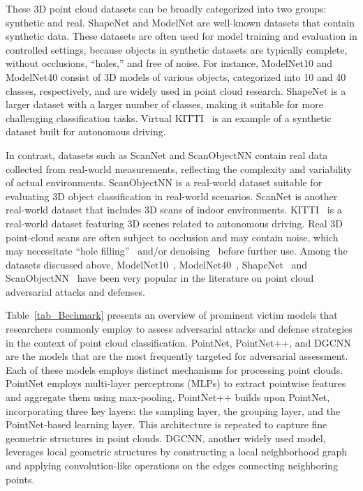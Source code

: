 \documentclass{ieeeaccess}
\begin{document}
These 3D point cloud datasets can be broadly categorized into two groups: synthetic and real. ShapeNet and ModelNet are well-known datasets that contain synthetic data. These datasets are often used for model training and evaluation in controlled settings, because objects in synthetic datasets are typically complete, without occlusions, ``holes,'' and free of noise. For instance, ModelNet10 and ModelNet40 consist of 3D models of various objects, categorized into 10 and 40 classes, respectively, and are widely used in point cloud research. ShapeNet is a larger dataset with a larger number of classes, making it suitable for more challenging classification tasks. Virtual KITTI~\cite{gaidon2016virtual} is an example of a synthetic dataset built for autonomous driving.  

In contrast, datasets such as ScanNet and ScanObjectNN contain real data collected from real-world measurements, reflecting the complexity and variability of actual environments. ScanObjectNN is a real-world dataset suitable for evaluating 3D object classification in real-world scenarios. ScanNet is another real-world dataset that includes 3D scans of indoor environments.  KITTI~\cite{geiger2012we} is a real-world dataset featuring 3D scenes related to autonomous driving. Real 3D point-cloud scans are often subject to occlusion and may contain noise, which may necessitate ``hole filling''~\cite{dinesh2018inpainting} and/or denoising~\cite{dinesh2020point} before further use.
Among the datasets discussed above,  ModelNet10~\cite{wu20153d}, ModelNet40~\cite{wu20153d}, ShapeNet~\cite{chang2015shapenet} and ScanObjectNN~\cite{uy2019revisiting} have been very popular in the literature on point cloud adversarial attacks and defenses. 

Table~\ref{tab_Bechmark} presents an overview of prominent victim models that researchers commonly employ to assess adversarial attacks and defense strategies in the context of point cloud classification. PointNet, PointNet++, and DGCNN are the models that are the most frequently targeted for adversarial assessment.
Each of these models employs distinct mechanisms for processing point clouds. PointNet employs multi-layer perceptrons (MLPs) to extract pointwise features and aggregate them using max-pooling. PointNet++ builds upon PointNet, incorporating three key layers: the sampling layer, the grouping layer, and the PointNet-based learning layer. This architecture is repeated to capture fine geometric structures in point clouds.
DGCNN, another widely used model, leverages local geometric structures by constructing a local neighborhood graph and applying convolution-like operations on the edges connecting neighboring points.
\end{document}
